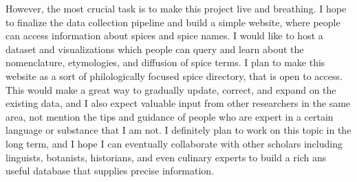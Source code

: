 However, the most crucial task is to make this project live and breathing. I hope to finalize the data collection pipeline and build a simple website, where people can access information about spices and spice names. I would like to host a dataset and visualizations which people can query and learn about the nomenclature, etymologies, and diffusion of spice terms. I plan to make this website as a sort of philologically focused spice directory, that is open to access. This would make a great way to gradually update, correct, and expand on the existing data, and I also expect valuable input from other researchers in the same area, not mention the tips and guidance of people who are expert in a certain language or substance that I am not. I definitely plan to work on this topic in the long term, and I hope I can eventually collaborate with other scholars including linguists, botanists, historians, and even culinary experts to build a rich ans useful database that supplies precise information.











